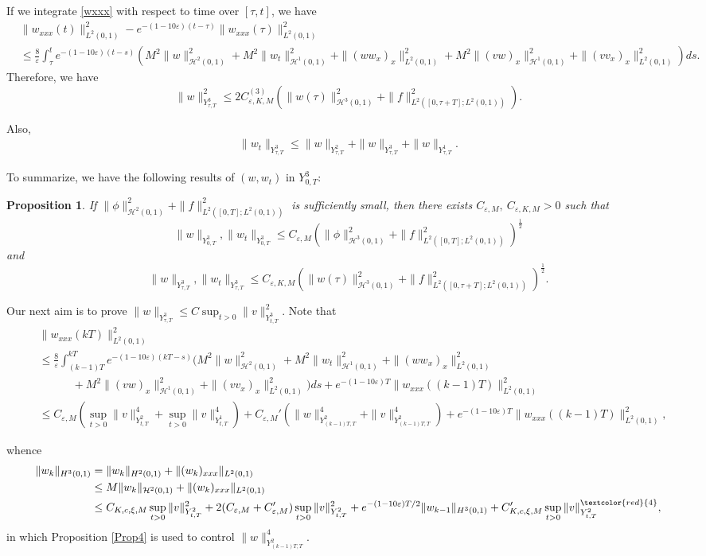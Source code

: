 \documentclass[10pt,a4paper,final]{article}
\numberwithin{equation}{section}
\newtheorem{prop}[theorem]{Proposition}
\newcommand{\cH}{\mathcal{H}}
\newcommand{\Ge}{\varepsilon}
\begin{document}
If we integrate \eqref{wxxx} with respect to time over $[\tau,t]$, we have 
\begin{align*}
    &\|w_{xxx}(t)\|_{L^2(0,1)}^2-e^{-(1-10\Ge)(t-\tau)}\|w_{xxx}(\tau)\|_{L^2(0,1)}^2\\
    &\leq \frac{8}{\Ge}\int_{\tau}^{t} e^{-(1-10\Ge)(t-s)}(M^2\|w\|_{\cH^2(0,1)}^2+M^2\|w_t\|_{\cH^1(0,1)}^2+\|(ww_x)_x\|_{L^2(0,1)}^2+M^2\|(vw)_x\|_{\cH^1(0,1)}^2+\|(vv_x)_x\|_{L^2(0,1)}^2)ds.
\end{align*}
Therefore, we have 
$$\|w\|_{Y^3_{\tau,T}}^2\leq 2C^{(3)}_{\Ge,K,M}(\|w(\tau)\|_{\cH^3(0,1)}^2+\|f\|_{L^2([0,\tau+T];L^2(0,1))}^2).$$

Also, 
\begin{eqnarray*}
\|w_t\|_{Y^3_{\tau,T}}\leq \|w\|_{Y^2_{\tau,T}}+\|w\|_{Y^3_{\tau,T}}+\|w\|_{Y^1_{\tau,T}}.
\end{eqnarray*}

To summarize, we have the following results of $(w, w_t)$ in $Y_{0,T}^3$:

\begin{prop}
    If $\|\phi\|_{\cH^2(0,1)}^2+\|f\|_{L^2([0,T];L^2(0,1))}^2$ is sufficiently small, then there exists $C_{\Ge,M},\ C_{\Ge,K,M}>0$ such that 
    $$\|w\|_{Y^3_{0,T}},\|w_t\|_{Y^3_{0,T}}\leq C_{\Ge,M}(\|\phi\|_{\cH^3(0,1)}^2+\|f\|_{L^2([0,T];L^2(0,1))}^2)^{\frac12}$$ 
    and 
    $$\|w\|_{Y^3_{\tau,T}},\|w_t\|_{Y^3_{\tau,T}}\leq C_{\Ge,K,M}(\|w(\tau)\|_{\cH^3(0,1)}^2+\|f\|_{L^2([0,\tau+T];L^2(0,1))}^2)^{\frac12}.$$
\end{prop}


Our next aim is to prove $\|w\|_{Y^{3}_{\tau,T}}\leq C\sup_{t>0}\|v\|_{Y^3_{t,T}}^2.$ Note that
\begin{align*}
    &\|w_{xxx}(kT)\|_{L^2(0,1)}^2\\
    &\leq \frac{8}{\Ge}\int_{(k-1)T}^{kT}e^{-(1-10\Ge)(kT-s)}(M^2\|w\|_{\cH^2(0,1)}^2+M^2\|w_t\|_{\cH^1(0,1)}^2+\|(ww_x)_x\|_{L^2(0,1)}^2\\
    &\quad\quad\quad+M^2\|(vw)_x\|_{\cH^1(0,1)}^2+\|(vv_x)_x\|_{L^2(0,1)}^2)ds+e^{-(1-10\Ge)T}\|w_{xxx}((k-1)T)\|_{L^2(0,1)}^2\\
    &\leq C_{\Ge,M}(\sup_{t>0}\|v\|_{Y^2_{t,T}}^4+\sup_{t>0}\|v\|_{Y^1_{t,T}}^4)+C_{\Ge,M}'(\|w\|_{Y^2_{(k-1)T,T}}^4+\|v\|_{Y^2_{(k-1)T,T}}^4)+e^{-(1-10\Ge)T}\|w_{xxx}((k-1)T)\|_{L^2(0,1)}^2,
\end{align*}

whence 
\begin{align*}
    \|w_k\|_{H^3(0,1)}&=\|w_k\|_{H^2(0,1)}+\|(w_k)_{xxx}\|_{L^2(0,1)}\\
    &\leq M\|w_k\|_{\cH^2(0,1)}+\|(w_k)_{xxx}\|_{L^2(0,1)}\\
    &\leq C_{K, c,\xi,M}\sup_{t>0}\|v\|_{Y^2_{t,T}}^2+2(C_{\Ge,M}+C'_{\Ge,M})\sup_{t>0}\|v\|_{Y^2_{t,T}}^2+e^{-(1-10\Ge)T/2}\|w_{k-1}\|_{H^3(0,1)}+C_{K,c,\xi,M}'\sup_{t>0}\|v\|_{Y^{2}_{t,T}}^{\textcolor{red}{4}},
\end{align*} 
in which Proposition \ref{Prop4} is used to control $\|w\|^4_{Y^2_{(k-1)T,T}}$.\\
\end{document}
